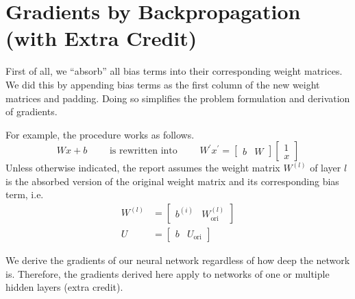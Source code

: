\documentclass[letterpaper]{article}
\begin{document}
 
\section{Gradients by Backpropagation (with Extra Credit)}
First of all, we ``absorb'' all bias terms into their corresponding weight matrices.  We did this by appending bias terms as the first column of the new weight matrices and padding. Doing so simplifies the problem formulation and derivation of gradients.

For example, the procedure works as follows.
\begin{equation}
W x + b
\qquad
\textrm{ is rewritten into }
\qquad
W^\prime
x^\prime
=
\begin{bmatrix}
b & W
\end{bmatrix}
\begin{bmatrix}
1 \\ x
\end{bmatrix}
\end{equation}
Unless otherwise indicated, the report assumes the weight matrix $W^{(l)}$ of layer $l$ is the absorbed version of the original weight matrix and its corresponding bias term, i.e.
\begin{equation}
\begin{split}
W^{(l)} & =
\begin{bmatrix}
b^{(i)} & W^{(l)}_\textrm{ori}
\end{bmatrix} \\
U &=
\begin{bmatrix}
b & U_\textrm{ori}
\end{bmatrix}
\end{split}
\end{equation}


We derive the gradients of our neural network regardless
of how deep the network is. Therefore, the gradients derived here apply to networks of one or multiple hidden layers (extra credit).

\vspace{0.1cm}
\end{document}
